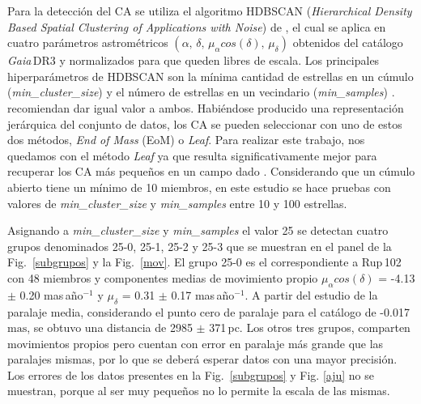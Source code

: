 \documentclass[baaa]{baaa}
\begin{document}

Para la detección del CA se utiliza el algoritmo {\sc HDBSCAN} ({\em Hierarchical Density Based Spatial Clustering of Applications with Noise}) de \citet{Campello2013}, el cual se aplica en cuatro par\'ametros astrom\'etricos $(\alpha,\,\delta,\,\mu_{\alpha}cos(\delta),\,\mu_{\delta})$ obtenidos del cat\'alogo \emph{Gaia}\,DR3 y normalizados para que queden libres de escala. %
 Los principales hiperpar\'ametros de {\sc HDBSCAN} son  la m\'inima cantidad de estrellas en un c\'umulo ({\em min\_cluster\_size}) y el n\'umero de estrellas en un vecindario ({\em min\_samples}) \citep{Alfonso2024}. \citet{Campello2013} recomiendan dar igual valor a ambos. Habi\'endose producido una representaci\'on jer\'arquica del conjunto de datos, los CA se pueden seleccionar con uno de estos dos m\'etodos, {\em End of Mass} (EoM) o {\em Leaf}. Para realizar este trabajo, nos quedamos con el m\'etodo {\em Leaf} ya que resulta significativamente mejor para recuperar los CA m\'as peque\~nos en un campo dado \citep{Hunt2021}. Considerando que un cúmulo abierto tiene un mínimo de 10 miembros, en este estudio se hace pruebas con valores de {\em min\_cluster\_size} y {\em min\_samples} entre 10 y 100 \-es\-tre\-llas.

Asignando a {\em min\_cluster\_size} y {\em min\_samples} el valor 25 se detectan cuatro grupos denominados 25-0, 25-1, 25-2 y 25-3 que se muestran en el panel de la Fig.~\ref{subgrupos} y la Fig.~\ref{mov}. El grupo 25-0 es el correspondiente a Rup\,102 con 48 miembros y componentes medias de movimiento propio $\mu_{\alpha}cos(\delta)$ =  -4.13 $\pm$ 0.20 mas\,a\~no$^{-1}$ y $\mu_{\delta}$ = 0.31 $\pm$ 0.17 mas\,a\~no$^{-1}$. A partir del estudio de la paralaje media, considerando el punto cero de paralaje para el cat\'alogo de -0.017~$\mathrm{mas}$, se obtuvo una distancia de 2985 $\pm$ 371\,pc. Los otros tres grupos, comparten movimientos propios pero cuentan con error en paralaje más grande que las paralajes mismas, por lo que se deberá esperar datos con una mayor precisi\'on. Los errores de los datos presentes en la Fig.~\ref{subgrupos} y Fig.   \ref{aju} no se muestran, porque al ser muy peque\~nos no lo permite la escala de las mismas.
\end{document}
